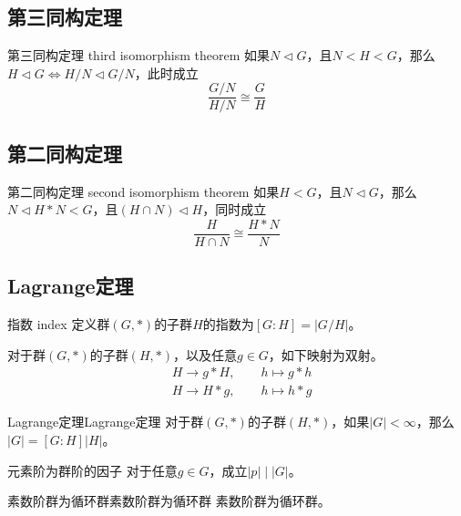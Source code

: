 \subsection{第三同构定理}

\begin{theorem}{第三同构定理 third isomorphism theorem}
	如果$N\lhd G$，且$N< H < G$，那么$H \lhd G\iff H/N\lhd G/N$，此时成立
	$$
	\frac{G/N}{H/N}\cong\frac{G}{H}
	$$
\end{theorem}

\subsection{第二同构定理}

\begin{theorem}{第二同构定理 second isomorphism theorem}
	如果$H< G$，且$N\lhd G$，那么$N\lhd H*N < G$，且$(H\cap N)\lhd H$，同时成立
	$$
	\frac{H}{H\cap N}\cong \frac{H*N}{N}
	$$
\end{theorem}

\subsection{Lagrange定理}

\begin{definition}{指数 index}
	定义群$(G,*)$的子群$H$的指数为$[G:H]=|G/H|$。
\end{definition}

\begin{lemma}
	对于群$(G,*)$的子群$(H,*)$，以及任意$g\in G$，如下映射为双射。
	\begin{align*}
	&H\to g*H,\qquad h\mapsto g*h\\
	&H\to H*g,\qquad h\mapsto h*g
	\end{align*}
\end{lemma}

\begin{theorem}{Lagrange定理}{Lagrange定理}
	对于群$(G,*)$的子群$(H,*)$，如果$|G|<\infty$，那么$|G|=[G:H]|H|$。
\end{theorem}

\begin{corollary}{元素阶为群阶的因子}
	对于任意$g\in G$，成立$|p|\mid |G|$。
\end{corollary}

\begin{corollary}{素数阶群为循环群}{素数阶群为循环群}
	素数阶群为循环群。
\end{corollary}

